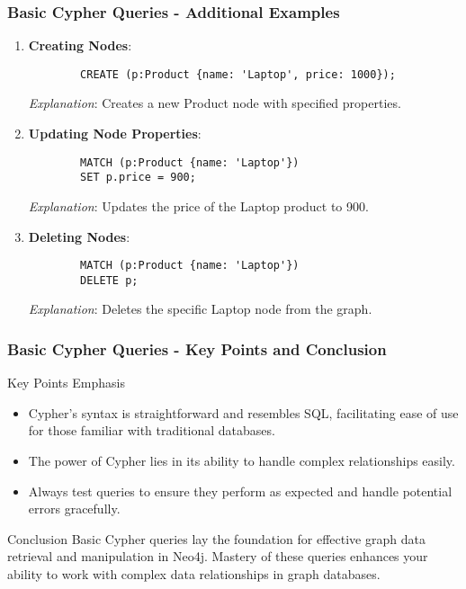 \documentclass[aspectratio=169]{beamer}
\begin{document}
\begin{frame}[fragile]
    \frametitle{Basic Cypher Queries - Additional Examples}
    \begin{enumerate}[resume]
        \item \textbf{Creating Nodes}:
        \begin{lstlisting}
        CREATE (p:Product {name: 'Laptop', price: 1000});
        \end{lstlisting}
        \textit{Explanation}: Creates a new Product node with specified properties.

        \item \textbf{Updating Node Properties}:
        \begin{lstlisting}
        MATCH (p:Product {name: 'Laptop'}) 
        SET p.price = 900;
        \end{lstlisting}
        \textit{Explanation}: Updates the price of the Laptop product to 900.

        \item \textbf{Deleting Nodes}:
        \begin{lstlisting}
        MATCH (p:Product {name: 'Laptop'}) 
        DELETE p;
        \end{lstlisting}
        \textit{Explanation}: Deletes the specific Laptop node from the graph.
    \end{enumerate}
\end{frame}

\begin{frame}[fragile]
    \frametitle{Basic Cypher Queries - Key Points and Conclusion}
    \begin{block}{Key Points Emphasis}
        \begin{itemize}
            \item Cypher’s syntax is straightforward and resembles SQL, facilitating ease of use for those familiar with traditional databases.
            \item The power of Cypher lies in its ability to handle complex relationships easily.
            \item Always test queries to ensure they perform as expected and handle potential errors gracefully.
        \end{itemize}
    \end{block}
    
    \begin{block}{Conclusion}
        Basic Cypher queries lay the foundation for effective graph data retrieval and manipulation in Neo4j. 
        Mastery of these queries enhances your ability to work with complex data relationships in graph databases.
    \end{block}
\end{frame}
\end{document}
